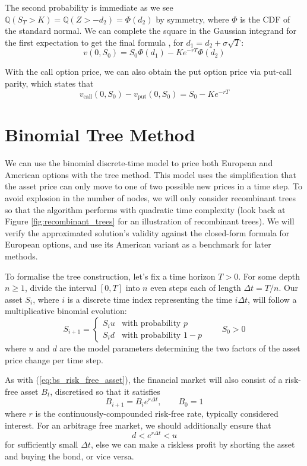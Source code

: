 The second probability is immediate as we see $\mathbb Q(S_T > K) = \mathbb Q(Z > -d_2) = \Phi(d_2)$ by symmetry, where $\Phi$ is the CDF of the standard normal. We can complete the square in the Gaussian integrand for the first expectation to get the final formula \cite{black1973pricing}, for $d_1 = d_2 + \sigma \sqrt T$:
\begin{equation}
    v(0, S_0) = S_0 \Phi(d_1) - Ke^{-rT}\Phi(d_2)
\end{equation}

With the call option price, we can also obtain the put option price via put-call parity, which states that
\begin{equation}
    v_\text{call}(0, S_0) - v_\text{put}(0, S_0) = S_0 - Ke^{-rT}
\end{equation}

\section{Binomial Tree Method}

We can use the binomial discrete-time model to price both European and American options with the tree method. This model uses the simplification that the asset price can only move to one of two possible new prices in a time step. To avoid explosion in the number of nodes, we will only consider recombinant trees so that the algorithm performs with quadratic time complexity (look back at Figure \ref{fig:recombinant_trees} for an illustration of recombinant trees). We will verify the approximated solution's validity against the closed-form formula for European options, and use its American variant as a benchmark for later methods.

To formalise the tree construction, let’s fix a time horizon $T > 0$. For some depth $n \ge 1$, divide the interval $[0, T]$ into $n$ even steps each of length $\Delta t = T/n$. Our asset $S_i$, where $i$ is a discrete time index representing the time $i \Delta t$, will follow a multiplicative binomial evolution:
\begin{equation}
    S_{i+1} = \begin{cases}
    S_i u & \text{with probability }p \\S_i d & \text{with probability }1-p
    \end{cases}\qquad S_0 > 0
\end{equation}
where $u$ and $d$ are the model parameters determining the two factors of the asset price change per time step.

As with (\ref{eq:bs_risk_free_asset}), the financial market will also consist of a risk-free asset $B_t$, discretised so that it satisfies
\begin{equation}
    B_{i+1} = B_i e^{r\Delta t}, \qquad B_0 = 1
\end{equation}
where $r$ is the continuously-compounded risk-free rate, typically considered interest. For an arbitrage free market, we should additionally ensure that
\begin{equation}
d < e^{r\Delta t} < u
\end{equation}
for sufficiently small $\Delta t$, else we can make a riskless profit by shorting the asset and buying the bond, or vice versa.

